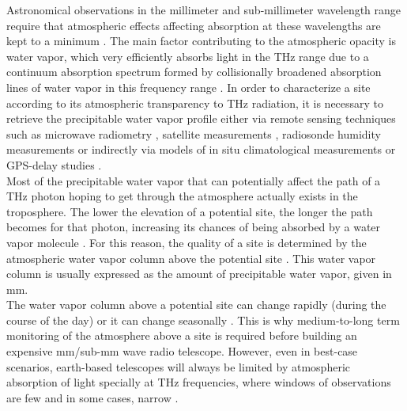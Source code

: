 \documentclass[12pt]{iopart}
\begin{document}
Astronomical observations in the millimeter and sub-millimeter wavelength range require that atmospheric effects affecting absorption at these wavelengths are kept to a minimum \cite{southpole,radford2016,chajpwv}. The main factor contributing to the atmospheric opacity is water vapor, which very efficiently absorbs light in the THz range \cite{pardocerni,pardocerni2,cont350} due to a continuum absorption spectrum formed by collisionally broadened absorption lines of water vapor in this frequency range  \cite{linecont,submmlines,turner2009}. In order to characterize a site according to its atmospheric transparency to THz radiation, it is necessary to retrieve the precipitable water vapor profile either via remote sensing techniques such as microwave radiometry \cite{radiometer,paine2000fourier,southpole2}, satellite measurements \cite{aqua,spacemols,suen2014,spaceradio}, radiosonde humidity measurements \cite{radiosonde,radiosonde2} or indirectly via models of in situ climatological measurements \cite{climatology} or GPS-delay studies \cite{gpsorig,gpsmap}. \\

Most of the precipitable water vapor that can potentially affect the path of a THz photon hoping to get through the atmosphere actually exists in the troposphere. The lower the elevation of a potential site, the longer the path becomes for that photon, increasing its chances of being absorbed by a water vapor molecule \cite{liebe1989mpm,linecont,lababs}. For this reason, the quality of a site is determined by the atmospheric water vapor column above the potential site \cite{mkradio,southpole3,he2012,atacama}. This water vapor column is usually expressed as the amount of precipitable water vapor, given in mm.\\

The water vapor column above a potential site can change rapidly (during the course of the day) or it can change seasonally \cite{arm2013,caumont2016}. This is why medium-to-long term monitoring of the atmosphere above a site is required before building an expensive mm/sub-mm wave radio telescope. However, even in best-case scenarios, earth-based telescopes will always be limited by atmospheric absorption of light specially at THz frequencies, where windows of observations are few and in some cases, narrow \cite{arrlim,limits}. \\
\end{document}
